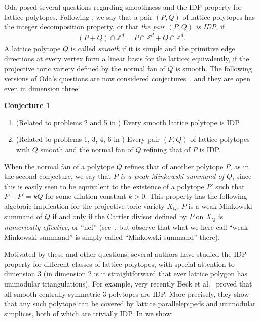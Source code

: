 \documentclass{amsart}
\theoremstyle{plain}
\theoremstyle{definition}
\newtheorem{conjecture}[theorem]{Conjecture}
\newcommand{\Z}{ \ensuremath{\mathbb{Z}}}
\begin{document}
Oda \cite{Oda1997} posed several questions regarding smoothness and the IDP property for lattice polytopes.
%
Following \cite{HaaseHof, Tsuchiya}, we say that a pair $(P, Q)$ of lattice polytopes has the integer decomposition property, or that \emph{the pair $(P,Q)$ is IDP}, if 
\begin{align*}
\label{eq:mixedIDP}
(P+Q) \cap \Z^d = P \cap \Z^d + Q \cap \Z^d.
\end{align*}
%
A lattice polytope $Q$ is called \emph{smooth} if it is simple and the primitive edge directions at every vertex form a linear basis for the lattice; equivalently, if the projective toric variety defined by the normal fan of $Q$ is smooth. 
The following versions of Oda's questions are now considered conjectures~\cite{HNPS2008,mfo2007}, and they are open even in dimension three:
\begin{conjecture}
\label{conj:Oda}
\begin{enumerate}
\item 
\label{itm:smoothIDP}
(Related to problems 2 and 5 in \cite{Oda1997})
Every smooth lattice polytope is IDP.
\item 
\label{itm:mixedIDP}
(Related to problems 1, 3, 4, 6 in \cite{Oda1997}) Every pair $(P,Q)$ of lattice polytopes with $Q$ smooth and the normal fan of $Q$ refining that of $P$ is IDP.
\end{enumerate}
\end{conjecture}

When the normal fan of a polytope $Q$ refines that of another polytope $P$, as in the second conjecture, we say that $P$ \emph{is a weak Minkowski summand of $Q$}, since this is easily seen to be equivalent to the existence of a polytope $P'$ such that $P+P' = k Q$ for some dilation constant $k>0$.
This property has the following algebraic implication for the projective toric variety $X_Q$: $P$ is a weak Minkowski summand of $Q$ if and only if the Cartier divisor defined by $P$ on  $X_Q$ is \emph{numerically effective}, or ``nef'' (see~\cite[Cor.~6.2.15, Prop.~6.3.12]{CLS}, but observe that what we here call  ``weak Minkowski summand'' is simply called ``Minkowski summand'' there). 


\medskip 
Motivated by these and other questions, several authors have studied the IDP property for different classes of lattice polytopes,
with special attention to dimension $3$ (in dimension 2 is it straightforward that ever lattice polygon has unimodular triangulations). 
%
For example,  very recently
Beck et al.~\cite{BHHHJKM2019} proved that all smooth centrally symmetric $3$-polytopes are IDP.
More precisely, they show that any such polytope can be covered by lattice 
parallelepipeds and unimodular simplices, both of which are trivially IDP.
%
In  we show:
\end{document}
